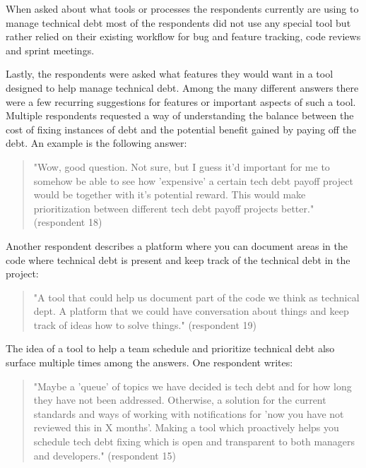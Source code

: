 When asked about what tools or processes the respondents currently are using to manage technical debt most of the respondents did not use any special tool but rather relied on their existing workflow for bug and feature tracking, code reviews and sprint meetings.

Lastly, the respondents were asked what features they would want in a tool designed to help manage technical debt.
Among the many different answers there were a few recurring suggestions for features or important aspects of such a tool.
Multiple respondents requested a way of understanding the balance between the cost of fixing instances of debt and the potential benefit gained by paying off the debt. An example is the following answer:
\begin{quote}
  "Wow, good question. Not sure, but I guess it'd important for me to somehow be able to see how 'expensive' a certain tech debt payoff project would be together with it's potential reward. This would make prioritization between different tech debt payoff projects better." (respondent 18)
\end{quote}
Another respondent describes a platform where you can document areas in the code where technical debt is present and keep track of the technical debt in the project:
\begin{quote}
  "A tool that could help us document part of the code we think as technical dept. A platform that we could have conversation about things and keep track of ideas how to solve things." (respondent 19)
\end{quote}
The idea of a tool to help a team schedule and prioritize technical debt also surface multiple times among the answers. One respondent writes:
\begin{quote}
  "Maybe a 'queue' of topics we have decided is tech debt and for how long they have not been addressed. Otherwise, a solution for the current standards and ways of working with notifications for 'now you have not reviewed this in X months'. Making a tool which proactively helps you schedule tech debt fixing which is open and transparent to both managers and developers." (respondent 15)
\end{quote} 